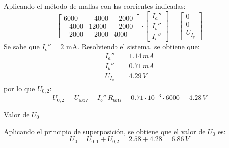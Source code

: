 \documentclass[11pt]{book} %
\begin{document}
\begin{example}
    Aplicando el método de mallas con las corrientes indicadas:
    \begin{equation*}
        \begin{bmatrix}
            6000 & -4000 & -2000\\
            -4000 & 12000 & -2000\\
            -2000 & -2000 & 4000
        \end{bmatrix}
        \cdot
        \begin{bmatrix}
            I_a''\\
            I_b''\\
            I_c''
        \end{bmatrix}
        =
        \begin{bmatrix}
            0\\
            0\\
            U_{I_g}
        \end{bmatrix}
    \end{equation*}
    Se sabe que $I_c''=2$ mA. Resolviendo el sistema, se obtiene que:
    \begin{align*}
        I_a''&=1.14\,mA\\
        I_b''&=0.71\,mA\\
        U_{I_g}&=4.29\,V
    \end{align*}
    por lo que $U_{0,2}$:
    \begin{equation*}
        U_{0,2}=U_{6k\Omega}=I_b''\, R_{6k\Omega}=0.71\cdot 10^{-3}\cdot 6000= 4.28\,V
    \end{equation*}
    
    \underline{Valor de $U_0$}
    
    Aplicando el principio de superposición, se obtiene que el valor de $U_0$ es:
    \begin{equation*}
        U_0=U_{0,1}+U_{0,2}=2.58+4.28=6.86\, V
    \end{equation*}
\end{example}





	
	
	
\end{document}
